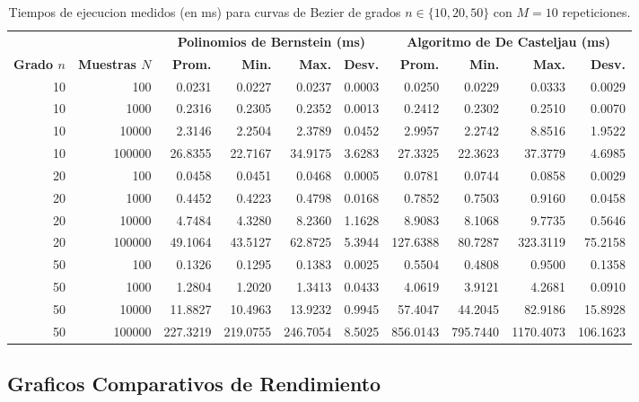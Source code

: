 \begin{table}[H]
\centering
\caption{Tiempos de ejecucion medidos (en ms) para curvas de Bezier de grados $n \in \{10, 20, 50\}$ con $M = 10$ repeticiones.}
\label{tab:exp_tiempos_altos}
\footnotesize
\begin{tabular}{rr rrrr rrrr}
\toprule
& & \multicolumn{4}{c}{\textbf{Polinomios de Bernstein (ms)}} & \multicolumn{4}{c}{\textbf{Algoritmo de De Casteljau (ms)}} \\
\cmidrule(lr){3-6} \cmidrule(lr){7-10}
\textbf{Grado $n$} & \textbf{Muestras $N$} & \textbf{Prom.} & \textbf{Min.} & \textbf{Max.} & \textbf{Desv.} & \textbf{Prom.} & \textbf{Min.} & \textbf{Max.} & \textbf{Desv.} \\
\midrule
10 & 100    & 0.0231 & 0.0227 & 0.0237 & 0.0003 & 0.0250 & 0.0229 & 0.0333 & 0.0029 \\
10 & 1000   & 0.2316 & 0.2305 & 0.2352 & 0.0013 & 0.2412 & 0.2302 & 0.2510 & 0.0070 \\
10 & 10000  & 2.3146 & 2.2504 & 2.3789 & 0.0452 & 2.9957 & 2.2742 & 8.8516 & 1.9522 \\
10 & 100000 & 26.8355 & 22.7167 & 34.9175 & 3.6283 & 27.3325 & 22.3623 & 37.3779 & 4.6985 \\
\midrule
20 & 100    & 0.0458 & 0.0451 & 0.0468 & 0.0005 & 0.0781 & 0.0744 & 0.0858 & 0.0029 \\
20 & 1000   & 0.4452 & 0.4223 & 0.4798 & 0.0168 & 0.7852 & 0.7503 & 0.9160 & 0.0458 \\
20 & 10000  & 4.7484 & 4.3280 & 8.2360 & 1.1628 & 8.9083 & 8.1068 & 9.7735 & 0.5646 \\
20 & 100000 & 49.1064 & 43.5127 & 62.8725 & 5.3944 & 127.6388 & 80.7287 & 323.3119 & 75.2158 \\
\midrule
50 & 100    & 0.1326 & 0.1295 & 0.1383 & 0.0025 & 0.5504 & 0.4808 & 0.9500 & 0.1358 \\
50 & 1000   & 1.2804 & 1.2020 & 1.3413 & 0.0433 & 4.0619 & 3.9121 & 4.2681 & 0.0910 \\
50 & 10000  & 11.8827 & 10.4963 & 13.9232 & 0.9945 & 57.4047 & 44.2045 & 82.9186 & 15.8928 \\
50 & 100000 & 227.3219 & 219.0755 & 246.7054 & 8.5025 & 856.0143 & 795.7440 & 1170.4073 & 106.1623 \\
\bottomrule
\end{tabular}
\end{table}

\subsection{Graficos Comparativos de Rendimiento}
\label{subsec:exp_graficos}

